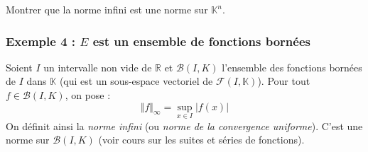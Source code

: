 \documentclass[french,11pt,twoside]{VcCours}
\begin{document}
\begin{Demonstration}{}
%
\end{Demonstration}

\begin{ApplicationDirecte} Montrer que la norme infini est une norme sur $\mathbb{K}^n$.
\end{ApplicationDirecte}

\subsubsection{Exemple 4 : \texorpdfstring{$E$}{E} est un ensemble de fonctions bornées}

Soient $I$ un intervalle non vide de $\mathbb{R}$ et $\mathcal{B}(I,K)$ l'ensemble des fonctions bornées de $I$ dans $\mathbb{K}$ (qui est un sous-espace vectoriel de $\mathcal{F}(I, \mathbb{K})$). Pour tout $f \in \mathcal{B}(I,K)$, on pose :
$$ \Vert f \Vert_{\infty} = \sup_{x \in I} \vert f(x) \vert $$
On définit ainsi la \emph{norme infini} (ou \emph{norme de la convergence uniforme}). C'est une norme sur $\mathcal{B}(I,K)$ (voir cours sur les suites et séries de fonctions).
%
\end{document}
